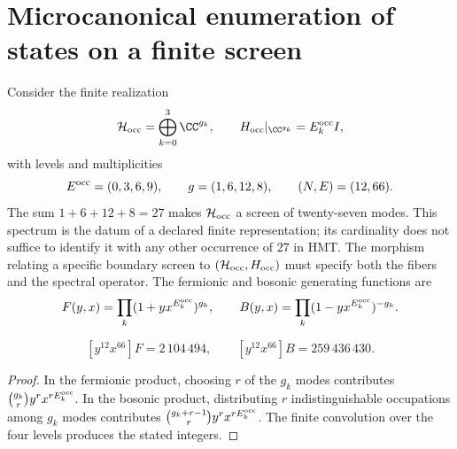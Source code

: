 \section{Microcanonical enumeration of states on a finite screen}
\label{v:v:rec:ocupacion:section:01}

Consider the finite realization
\[
 \mathcal H_{\rm occ}=\bigoplus_{k=0}^{3}\CC^{g_k},
 \qquad
 H_{\rm occ}|_{\CC^{g_k}}=E_k^{\rm occ} I,
\]
with levels and multiplicities
\[
 E^{\rm occ}=(0,3,6,9),\qquad g=(1,6,12,8),
 \qquad(N,E)=(12,66).
\]
The sum \(1+6+12+8=27\) makes \(\mathcal H_{\rm occ}\) a screen of
twenty-seven modes. This spectrum is the datum of a declared finite
representation; its cardinality does not suffice to identify it with any other
occurrence of \(27\) in HMT\@. The morphism relating a specific
boundary screen to \((\mathcal H_{\rm occ},H_{\rm occ})\) must specify both
the fibers and the spectral operator.
The fermionic and bosonic generating functions are
\[
 F(y,x)=\prod_k(1+yx^{E_k^{\rm occ}})^{g_k},
 \qquad
 B(y,x)=\prod_k(1-yx^{E_k^{\rm occ}})^{-g_k}.
\]

\begin{proposition}
\label{v:v:rec:prop:cardinalidades-microcanonicas}
\[
 [y^{12}x^{66}]F=2\,104\,494,
 \qquad
 [y^{12}x^{66}]B=259\,436\,430.
\]
\end{proposition}
\begin{proof}
In the fermionic product, choosing \(r\) of the \(g_k\) modes contributes
\(\binom{g_k}{r}y^rx^{rE_k^{\rm occ}}\). In the bosonic product, distributing \(r\)
indistinguishable occupations among \(g_k\) modes contributes
\(\binom{g_k+r-1}{r}y^rx^{rE_k^{\rm occ}}\). The finite convolution over the
four levels produces the stated integers.
\end{proof}

